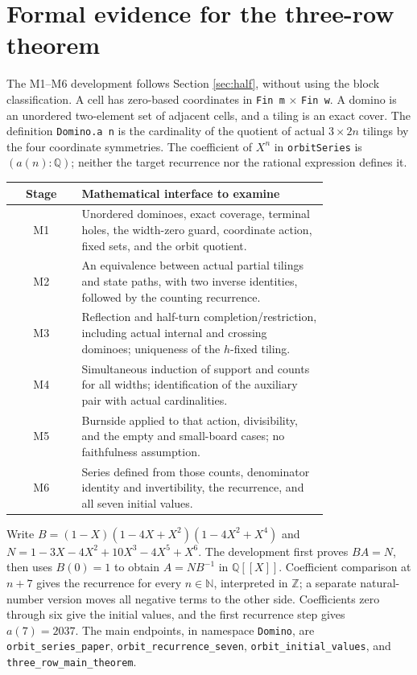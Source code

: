 \section{Formal evidence for the three-row theorem}\label{sec:formalization}

The M1--M6 development follows Section \ref{sec:half}, without using
the block classification. A cell has zero-based coordinates in
\texttt{Fin m} $\times$ \texttt{Fin w}. A domino is an unordered
two-element set of adjacent cells, and a tiling is an exact cover.
The definition \texttt{Domino.a n} is the cardinality of the quotient
of actual $3\times2n$ tilings by the four coordinate symmetries.
The coefficient of $X^n$ in \texttt{orbitSeries} is $(a(n):\mathbb Q)$;
neither the target recurrence nor the rational expression defines it.

\begin{center}
\small
\begin{tabular}{cp{0.78\linewidth}}
\toprule
Stage & Mathematical interface to examine\\
\midrule
M1 & Unordered dominoes, exact coverage, terminal holes, the width-zero
guard, coordinate action, fixed sets, and the orbit quotient.\\
M2 & An equivalence between actual partial tilings and state paths,
with two inverse identities, followed by the counting recurrence.\\
M3 & Reflection and half-turn completion/restriction, including actual
internal and crossing dominoes; uniqueness of the $h$-fixed tiling.\\
M4 & Simultaneous induction of support and counts for all widths;
identification of the auxiliary pair with actual cardinalities.\\
M5 & Burnside applied to that action, divisibility, and the empty and
small-board cases; no faithfulness assumption.\\
M6 & Series defined from those counts, denominator identity and
invertibility, the recurrence, and all seven initial values.\\
\bottomrule
\end{tabular}
\end{center}

Write $B=(1-X)(1-4X+X^2)(1-4X^2+X^4)$ and
$N=1-3X-4X^2+10X^3-4X^5+X^6$.
The development first proves $B A=N$, then uses $B(0)=1$ to obtain
$A=NB^{-1}$ in $\mathbb Q[[X]]$. Coefficient comparison at $n+7$
gives the recurrence for every $n\in\mathbb N$, interpreted in
$\mathbb Z$; a separate natural-number version moves all negative
terms to the other side. Coefficients zero through six give the
initial values, and the first recurrence step gives $a(7)=2037$.
The main endpoints, in namespace \texttt{Domino}, are
\texttt{orbit\_series\_paper}, \texttt{orbit\_recurrence\_seven},
\texttt{orbit\_initial\_values}, and \texttt{three\_row\_main\_theorem}.

